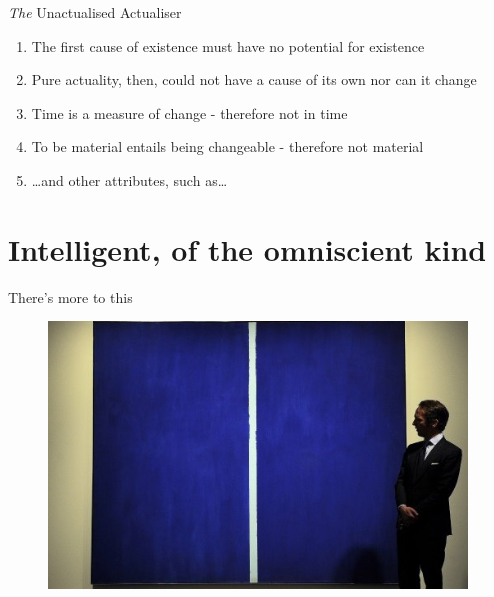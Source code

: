 \documentclass[xcolor=dvipsnames]{beamer}
\begin{document}
\begin{frame}[fragile]{\emph{The} Unactualised Actualiser}
  \begin{enumerate}
  \item The first cause of existence must have no potential for existence \vspace{5mm}
  \item Pure actuality, then, could not have a cause of its own nor can it change \vspace{5mm}
  \item Time is a measure of change - therefore not in time \vspace{5mm}
  \item To be material entails being changeable - therefore not material \vspace{5mm}
  \item \ldots and other attributes, such as\ldots
  \end{enumerate}
\end{frame}


\section{Intelligent, of the omniscient kind}


\begin{frame}{There's more to this}
\begin{figure}
  \centering
  \begin{columns}
    \centering
    \includegraphics[width=0.99\textwidth]{abstract}
  \end{columns}
\end{figure}
\end{frame}
\end{document}
